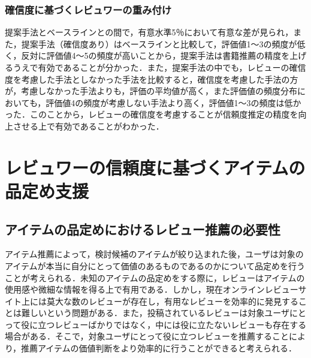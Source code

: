 \documentclass[a4paper,11pt,oneside,openany]{jsbook}
\begin{document}
	\subsection{確信度に基づくレビュワーの重み付け}
提案手法とベースラインとの間で，有意水準5％において有意な差が見られ，また，提案手法（確信度あり）はベースラインと比較して，評価値1〜3の頻度が低く，反対に評価値4〜5の頻度が高いことから，提案手法は書籍推薦の精度を上げるうえで有効であることが分かった．また，提案手法の中でも，レビューの確信度を考慮した手法としなかった手法を比較すると，確信度を考慮した手法の方が，考慮しなかった手法よりも，評価の平均値が高く，また評価値の頻度分布においても，評価値4の頻度が考慮しない手法より高く，評価値1〜3の頻度は低かった．このことから，レビューの確信度を考慮することが信頼度推定の精度を向上させる上で有効であることがわかった．


\chapter{レビュワーの信頼度に基づくアイテムの品定め支援}
\label{sec:rev_recommend}
	\section{アイテムの品定めにおけるレビュー推薦の必要性}
アイテム推薦によって，検討候補のアイテムが絞り込まれた後，ユーザは対象のアイテムが本当に自分にとって価値のあるものであるのかについて品定めを行うことが考えられる．未知のアイテムの品定めをする際に，レビューはアイテムの使用感や微細な情報を得る上で有用である．しかし，現在オンラインレビューサイト上には莫大な数のレビューが存在し，有用なレビューを効率的に発見することは難しいという問題がある．また，投稿されているレビューは対象ユーザにとって役に立つレビューばかりではなく，中には役に立たないレビューも存在する場合がある．そこで，対象ユーザにとって役に立つレビューを推薦することにより，推薦アイテムの価値判断をより効率的に行うことができると考えられる．
\end{document}
